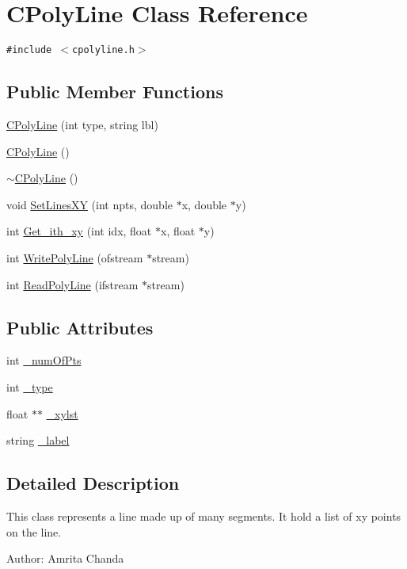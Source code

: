 \hypertarget{classCPolyLine}{
\section{CPoly\-Line Class Reference}
\label{classCPolyLine}
}
{\tt \#include $<$cpolyline.h$>$}

\subsection*{Public Member Functions}
\begin{CompactItemize}
\item 
\hyperlink{classCPolyLine_a0}{CPoly\-Line} (int type, string lbl)
\item 
\hyperlink{classCPolyLine_a1}{CPoly\-Line} ()
\item 
\hyperlink{classCPolyLine_a2}{$\sim$CPoly\-Line} ()
\item 
void \hyperlink{classCPolyLine_a3}{Set\-Lines\-XY} (int npts, double $\ast$x, double $\ast$y)
\item 
int \hyperlink{classCPolyLine_a4}{Get\_\-ith\_\-xy} (int idx, float $\ast$x, float $\ast$y)
\item 
int \hyperlink{classCPolyLine_a5}{Write\-Poly\-Line} (ofstream $\ast$stream)
\item 
int \hyperlink{classCPolyLine_a6}{Read\-Poly\-Line} (ifstream $\ast$stream)
\end{CompactItemize}
\subsection*{Public Attributes}
\begin{CompactItemize}
\item 
int \hyperlink{classCPolyLine_o0}{\_\-num\-Of\-Pts}
\item 
int \hyperlink{classCPolyLine_o1}{\_\-type}
\item 
float $\ast$$\ast$ \hyperlink{classCPolyLine_o2}{\_\-xylst}
\item 
string \hyperlink{classCPolyLine_o3}{\_\-label}
\end{CompactItemize}


\subsection{Detailed Description}
This class represents a line made up of many segments. It hold a list of xy points on the line. \begin{Desc}
\item[Author:]Amrita Chanda \end{Desc}




